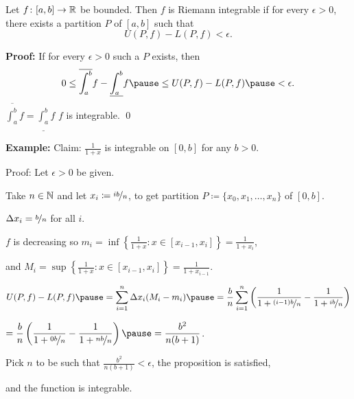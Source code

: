 \documentclass[10pt,aspectratio=169]{beamer}
\begin{document}
\begin{frame}

\begin{proposition}
Let $f \colon [a,b] \to {\mathbb{R}}$ be bounded.  Then $f$ is Riemann
integrable if for every $\epsilon > 0$, there exists a partition $P$ of
$[a,b]$ such that
\begin{equation*}
U(P,f) - L(P,f) < \epsilon .
\end{equation*}
\end{proposition}

\pause
\textbf{Proof:}
If for every $\epsilon > 0$ such a $P$ exists, then
\begin{equation*}
0 \leq
\overline{\int_a^b} f - 
\underline{\int_a^b} f
\pause
\leq
U(P,f) - L(P,f)
\pause
< \epsilon .
\end{equation*}
\pause
\thus \quad
$\displaystyle \overline{\int_a^b} f = \underline{\int_a^b} f$
\pause
\wthus
$f$ is integrable.
\qed

\end{frame}

\begin{frame}

\textbf{Example:}
Claim: $\frac{1}{1+x}$ is integrable on $[0,b]$ for any $b > 0$.

\pause
\medskip

Proof: Let $\epsilon > 0$ be given.

\pause
Take $n \in {\mathbb{N}}$ and
\pause
let $x_i \coloneqq \nicefrac{ib}{n}$,
\pause
to get partition
$P \coloneqq \{ x_0,x_1,\ldots,x_n \}$ of $[0,b]$.

\pause
$\Delta x_i = \nicefrac{b}{n}$ for all $i$.  

\pause
\medskip

$f$ is decreasing so
$
m_i = \inf \left\{ \frac{1}{1+x} : x \in [x_{i-1},x_i] \right\} =
\frac{1}{1+x_i}$,

\pause
and
$M_i = \sup \left\{ \frac{1}{1+x} : x \in [x_{i-1},x_i] \right\} =
\frac{1}{1+x_{i-1}}$.

\pause
\medskip

\thus \quad
$\displaystyle
U(P,f)-L(P,f)
\pause
=
\sum_{i=1}^n
\Delta x_i
(M_i-m_i)
\pause
=
\frac{b}{n}
\sum_{i=1}^n 
\left( \frac{1}{1+\nicefrac{(i-1)b}{n}} - \frac{1}{1+\nicefrac{ib}{n}} \right) 
$

\pause
\medskip

\qquad\qquad\qquad
$\displaystyle
=
\frac{b}{n}
\left( \frac{1}{1+\nicefrac{0b}{n}} - \frac{1}{1+\nicefrac{nb}{n}} \right) 
\pause
=
\frac{b^2}{n(b+1)}$.

\pause
\medskip

Pick $n$ to be such that
$\frac{b^2}{n(b+1)} < \epsilon$,
\pause
the proposition is satisfied,

\pause
and the function is integrable.
\end{frame}
\end{document}
